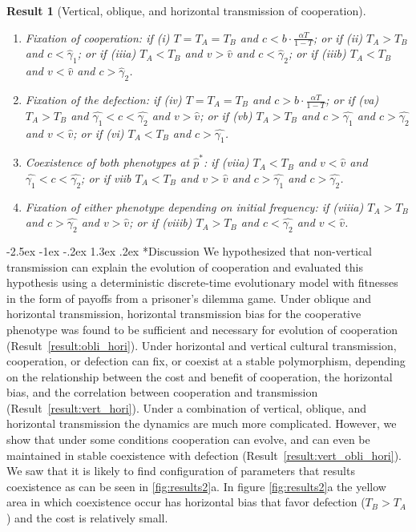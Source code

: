 \documentclass[12pt]{extarticle}
\makeatletter
\renewcommand\section{\@startsection {section}{1}{\z@}%
     {-2.5ex \@plus -1ex \@minus -.2ex}%
     {1.3ex \@plus.2ex}%
    {\Large\bfseries}}
\newtheorem{result}{Result}
\makeatother
\begin{document}
{\begin{result}[Vertical, oblique, and horizontal transmission of cooperation]
\begin{enumerate}
\item \emph{Fixation of cooperation}: 
	if \emph{(i)} $T=T_A=T_B$ and $c < b\cdot \frac{\alpha T}{1-T}$; or
	if \emph{(ii)} $T_A>T_B$ and $c < \hat\gamma_1$; or 
	if \emph{(iiia)} $T_A<T_B$ and $v>\hat v$ and $c < \hat\gamma_2$; or
	if \emph{(iiib)} $T_A<T_B$ and $v<\hat v$ and $c > \hat\gamma_2$.
\item \emph{Fixation of the defection}: 
	if \emph{(iv)}  $T=T_A=T_B$ and $c > b\cdot \frac{\alpha T}{1-T}$; or 
  if \emph{(va)} $T_A>T_B$ and $\hat{\gamma_1} < c < \hat{\gamma_2}$ and $v>\hat{v}$; or 
  if \emph{(vb)} $T_A>T_B$ and $ c > \hat{\gamma_1} $ and $ c > \hat{\gamma_2}$ and $v<\hat{v}$; or 
	if \emph{(vi)} $T_A<T_B$ and $c>\hat{\gamma_1}$.
\item \emph{Coexistence of both phenotypes at $\hat{p}^*$}: 
  if \emph{(viia)} $T_A < T_B$ and $v<\hat{v}$ and $\hat{\gamma_1}<c<\hat{\gamma_2}$; or
  if \emph{viib} $T_A < T_B$ and $v>\hat{v}$ and $c>\hat{\gamma_1}$ and $c>\hat{\gamma_2}$. %
\item \emph{Fixation of either phenotype depending on initial frequency}:
  if \emph{(viiia)}  $T_A>T_B$ and $c > \hat{\gamma_2}$ and $v>\hat{v}$; or
  if \emph{(viiib)}  $T_A>T_B$ and $c < \hat{\gamma_2}$ and $v<\hat{v}$.
\end{enumerate}
\end{result}



\section*{Discussion}
We hypothesized that non-vertical transmission can explain the evolution of cooperation and evaluated this hypothesis using a deterministic discrete-time evolutionary model with fitnesses in the form of payoffs from a prisoner's dilemma game.
Under oblique and horizontal transmission, horizontal transmission bias for the cooperative phenotype was found to be sufficient and necessary for evolution of cooperation (Result~\autoref{result:obli_hori}).
Under horizontal and vertical cultural transmission, cooperation, or defection can fix, or coexist at a stable polymorphism, depending on the relationship between the cost and benefit of cooperation, the horizontal bias, and the correlation between cooperation and transmission (Result~\autoref{result:vert_hori}).
Under a combination of vertical, oblique, and horizontal transmission the dynamics are much more complicated. However, we show that under some conditions cooperation can evolve, and can even be maintained in stable coexistence with defection (Result~\autoref{result:vert_obli_hori}).
We saw that it is likely to find configuration of parameters that results coexistence as can be seen in \autoref{fig:results2}a. In figure \autoref{fig:results2}a the yellow area in which coexistence occur has horizontal bias that favor defection ($T_B>T_A$) and the cost is relatively small. 

}
\end{document}
